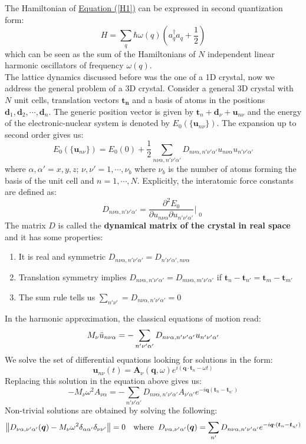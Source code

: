 \documentclass[10.75pt,a4paper,openright,bottom=2cm]{article}
\renewcommand{\Vec}[1]{\boldsymbol{#1}}
\begin{document}
The Hamiltonian of \hyperref[H1]{Equation (\ref{H1})} can be expressed in second quantization form:
\[
H=\sum_q\hbar\omega(q)\left(a_q^\dagger a_q+\frac{1}{2}\right)
\]
which can be seen as the sum of the Hamiltonians of $N$ independent linear harmonic oscillators of frequency $\omega(q)$.\\
The lattice dynamics discussed before was the one of a 1D crystal, now we address the general problem of a 3D crystal. Consider a general 3D crystal with $N$ unit cells, translation vectors $\Vec{t_n}$ and a basis of atoms in the positions $\Vec{d}_1,\Vec{d}_2,\cdots,\Vec{d}_n$. The generic position vector is given by $\Vec{t}_n+\Vec{d}_\nu+\Vec{u}_{n\nu}$ and the energy of the electronic-nuclear system is denoted by $E_0(\{\Vec{u}_{n\nu}\})$. The expansion up to second order gives us:
\[
E_0(\{\Vec{u}_{n\nu}\})=E_0(0)+\frac{1}{2}\sum_{n\nu\alpha,n'\nu'\alpha'}D_{n\nu\alpha,n'\nu'\alpha'}u_{n\nu\alpha}u_{n'\nu'\alpha'}
\]
where $\alpha,\alpha'=x,y,z$; $\nu,\nu'=1,\cdots,\nu_b$ where $\nu_b$ is the number of atoms forming the basis of the unit cell and $n=1,\cdots,N$. Explicitly, the interatomic force constants are defined as:
\[
D_{n\nu\alpha,n'\nu'\alpha'}=\frac{\partial^2E_0}{\partial u_{n\nu\alpha}\partial u_{n'\nu'\alpha'}}\Bigr|_{\substack{0}}
\]
The matrix $D$ is called the \textbf{dynamical matrix of the crystal in real space} and it has some properties:
\begin{enumerate}
    \item It is real and symmetric $D_{n\nu\alpha,n'\nu'\alpha'}=D_{n'\nu'\alpha',n\nu\alpha}$
    \item Translation symmetry implies $D_{n\nu\alpha,n'\nu'\alpha'}=D_{m\nu\alpha,m'\nu'\alpha'}$ if $\Vec{t}_n-\Vec{t}_{n'}=\Vec{t}_m-\Vec{t}_{m'}$
    \item The sum rule tells us $\sum_{n'\nu'}=D_{n\nu\alpha,n'\nu'\alpha'}=0$
\end{enumerate}
In the harmonic approximation, the classical equations of motion read:
\[
M_\nu\Ddot{u}_{n\nu\alpha}=-\sum_{n'\nu'\alpha'}D_{n\nu\alpha,n'\nu'\alpha'}u_{n'\nu'\alpha'}
\]
We solve the set of differential equations looking for solutions in the form:
\[
\Vec{u}_{n\nu}(t)=\Vec{A}_\nu(\Vec{q},\omega)e^{i(\Vec{q}\cdot\Vec{t}_n-\omega t)}
\]
Replacing this solution in the equation above gives us:
\[
-M_\nu\omega^2A_{\nu\alpha}=-\sum_{n'\nu'\alpha'}D_{n\nu\alpha,n'\nu'\alpha'}A_{\nu'\alpha'}e^{-i\Vec{q}(\Vec{t}_n-\Vec{t}_{n'})}
\]
Non-trivial solutions are obtained by solving the following:
\[
\norm{D_{\nu\alpha,\nu'\alpha'}(\Vec{q})-M_\nu\omega^2\delta_{\alpha\alpha'}\delta_{\nu\nu'}}=0 \quad \text{where}\;\; D_{\nu\alpha,\nu'\alpha'}(\Vec{q})=\sum_{n'}D_{n\nu\alpha,n'\nu'\alpha'}e^{-i\Vec{q}\cdot(\Vec{t}_n-\Vec{t}_{n'})}
\]
\end{document}
